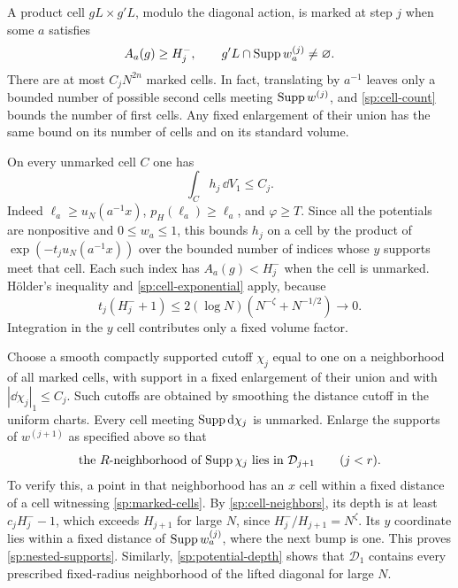 A product cell $gL\times g'L$, modulo the diagonal action, is marked
at step $j$ when some $a$ satisfies
\begin{equation}\label{sp:marked-cells}
 A_a(g)\ge H_j^-,\qquad
 g'L\cap\operatorname{Supp} w_a^{(j)}\ne\varnothing.
\end{equation}
There are at most $C_jN^{2n}$ marked cells.  In fact, translating by
$a^{-1}$ leaves only a bounded number of possible second cells meeting
$\operatorname{Supp} w^{(j)}$, and \eqref{sp:cell-count} bounds the number of first
cells.  Any fixed enlargement of their union has the same bound on its
number of cells and on its standard volume.

On every unmarked cell $C$ one has
\begin{equation}\label{sp:unmarked-weight}
 \int_C h_j\,\dd V_1\le C_j.
\end{equation}
Indeed $\ell_a\ge u_N(a^{-1}x)$, $p_H(\ell_a)\ge\ell_a$, and
$\varphi\ge T$.  Since all the potentials are nonpositive and
$0\le w_a\le1$, this bounds $h_j$ on a cell by the product of
$\exp(-t_ju_N(a^{-1}x))$ over the bounded number of indices whose
$y$ supports meet that cell.  Each such index has $A_a(g)<H_j^-$
when the cell is unmarked.  H\"older's inequality and
\eqref{sp:cell-exponential} apply, because
\[
 t_j(H_j^-+1)\le 2(\log N)(N^{-\zeta}+N^{-1/2})\longrightarrow0.
\]
Integration in the $y$ cell contributes only a fixed volume factor.

Choose a smooth compactly supported cutoff $\chi_j$ equal to one on
a neighborhood of all marked cells, with support in a fixed enlargement
of their union and with $|\dd\chi_j|_1\le C_j$.  Such cutoffs are
obtained by smoothing the distance cutoff in the uniform charts.
Every cell meeting $\operatorname{Supp}\mathrm d\chi_j$ is unmarked.
Enlarge the supports of $w^{(j+1)}$ as specified above so that
\begin{equation}\label{sp:nested-supports}
 \text{the $R$-neighborhood of $\operatorname{Supp}\chi_j$ lies in }
 \mathcal D_{j+1}\qquad(j<r).
\end{equation}
To verify this, a point in that neighborhood has an $x$ cell within a
fixed distance of a cell witnessing \eqref{sp:marked-cells}.
By \eqref{sp:cell-neighbors}, its depth is at least
$c_jH_j^--1$, which exceeds $H_{j+1}$ for large $N$, since
$H_j^-/H_{j+1}=N^\zeta$.  Its $y$ coordinate lies within a fixed
distance of $\operatorname{Supp} w_a^{(j)}$, where the next bump is one.  This
proves \eqref{sp:nested-supports}.  Similarly,
\eqref{sp:potential-depth} shows that $\mathcal D_1$ contains every
prescribed fixed-radius neighborhood of the lifted diagonal for large
$N$.

